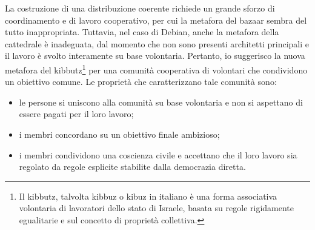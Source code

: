 \documentclass[a4paper,12pt,titlepage,oneside]{book}
\begin{document}
    La costruzione di una distribuzione coerente richiede un grande sforzo di coordinamento e di lavoro cooperativo, per cui la metafora del bazaar sembra del tutto inappropriata. Tuttavia, nel
    caso di Debian, anche la metafora della cattedrale è inadeguata, dal momento che non sono presenti architetti principali e il lavoro è svolto interamente su base volontaria. Pertanto, io suggerisco la nuova metafora del kibbutz\footnote{Il kibbutz, 
    talvolta kibbuz o kibuz in italiano è una forma associativa volontaria di lavoratori dello stato di Israele,  basata su regole rigidamente egualitarie e sul concetto di proprietà collettiva.}
    per una comunità cooperativa di volontari che condividono un obiettivo comune. Le proprietà che caratterizzano tale comunità sono:
    
\begin{itemize}
    \item le persone si uniscono alla comunità su base volontaria e non si aspettano di essere pagati per il 
    loro lavoro;
    \item i membri concordano su un obiettivo finale ambizioso;
    \item i membri condividono una coscienza civile e accettano che il loro lavoro sia regolato da regole esplicite
    stabilite dalla democrazia diretta.
\end{itemize}
\end{document}
